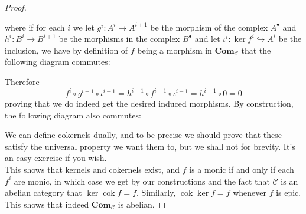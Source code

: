 \documentclass{article}
\newcommand{\fC}{\mathscr{C}}
\DeclareMathOperator{\cok}{cok}
\newcommand{\Com}{\mathbf{Com}} %
\begin{document}
\begin{proof}
\begin{center}
    \end{center}
    where if for each $i$ we let $g^i:A^i\to A^{i+1}$ be the morphism of the complex $A^\bullet$ and $h^i:B^i\to B^{i+1}$ be the morphisms in the complex $B^\bullet$ and let $\iota^i:\ker f^i\hookrightarrow A^i$ be the inclusion, we have by definition of $f$ being a morphism in $\Com_\fC$ that the following diagram commutes:
    \begin{center}
    \end{center}
    Therefore
    \[
    f^i\circ g^{i-1}\circ \iota^{i-1}=h^{i-1}\circ f^{i-1} \circ \iota^{i-1}= h^{i-1}\circ 0=0
    \]
    proving that we do indeed get the desired induced morphisms. By construction, the following diagram also commutes:
    \begin{center}
    \end{center}
    We can define cokernels dually, and to be precise we should prove that these satisfy the universal property we want them to, but we shall not for brevity. It's an easy exercise if you wish.\\
    This shows that kernels and cokernels exist, and $f$ is a monic if and only if each $f^i$ are monic, in which case we get by our constructions and the fact that $\fC$ is an abelian category that $\ker \cok f=f$. Similarly, $\cok \ker f=f$ whenever $f$ is epic. This shows that indeed $\Com_\fC$ is abelian.
\end{proof}
\end{document}
